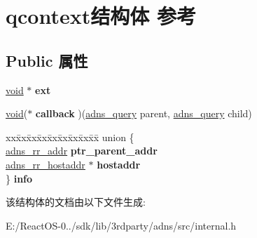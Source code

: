 \hypertarget{structqcontext}{}\section{qcontext结构体 参考}
\label{structqcontext}
\subsection*{Public 属性}
\begin{DoxyCompactItemize}
\item 
\mbox{\label{structqcontext_a548c6b2e9dbfe23320577a4493e0c901}} 
\hyperlink{interfacevoid}{void} $\ast$ {\bfseries ext}
\item 
\mbox{\label{structqcontext_a2b08a4a16ceb1458d9884803fdd12faa}} 
\hyperlink{interfacevoid}{void}($\ast$ {\bfseries callback} )(\hyperlink{structadns____query}{adns\+\_\+query} parent, \hyperlink{structadns____query}{adns\+\_\+query} child)
\item 
\mbox{\label{structqcontext_a3ff3da17476aa98b21c7544c6c61e31e}} 
\begin{tabbing}
xx\=xx\=xx\=xx\=xx\=xx\=xx\=xx\=xx\=\kill
union \{\\
\>\hyperlink{structadns__rr__addr}{adns\_rr\_addr} {\bfseries ptr\_parent\_addr}\\
\>\hyperlink{structadns__rr__hostaddr}{adns\_rr\_hostaddr} $\ast$ {\bfseries hostaddr}\\
\} {\bfseries info}\\

\end{tabbing}\end{DoxyCompactItemize}


该结构体的文档由以下文件生成\+:\begin{DoxyCompactItemize}
\item 
E\+:/\+React\+O\+S-\/0../sdk/lib/3rdparty/adns/src/internal.\+h\end{DoxyCompactItemize}
